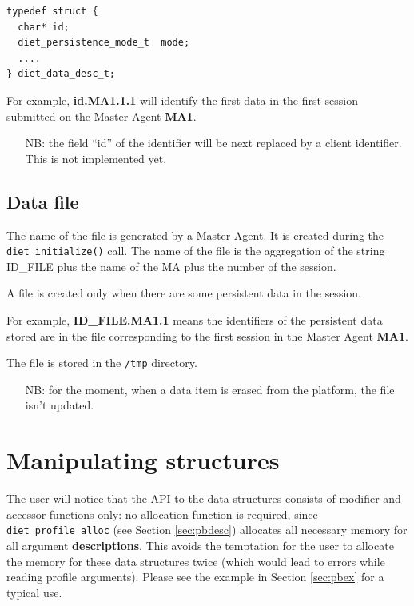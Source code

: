 {\footnotesize
\begin{verbatim}
typedef struct {
  char* id;  
  diet_persistence_mode_t  mode;
  ....
} diet_data_desc_t;
\end{verbatim}
}

For example, \textbf{id.MA1.1.1} will identify the first data
in the first session submitted on the Master Agent \textbf{MA1}.


\begin{itemize}
\item[NB:] the field ``id'' of the identifier will be next replaced by a
client identifier. This is not implemented yet.
\end{itemize}

\subsection{Data file}
\label{ssec:datafile}

The name of the file is generated by a Master Agent. It is created
during the \texttt{diet\_initialize()} call. The name of the file is
the aggregation of the string ID\_FILE plus the name of the MA plus
the number of the session.  

A file is created only when there are some persistent data in the
session.  

For example, \textbf{ID\_FILE.MA1.1} means the identifiers
of the persistent data stored are in the file corresponding to the
first session in the Master Agent \textbf{MA1}.

The file is stored in the \texttt{/tmp} directory.

\begin{itemize}
\item[NB:] for the moment, when a data item is erased from the platform, the
file isn't updated.
\end{itemize}


\section{Manipulating \diet structures}
\label{sec:manip}

The user will notice that the API to the \diet data structures consists of
modifier and accessor functions only: no allocation function is required, since
\texttt{diet\_profile\_alloc} (see Section \ref{sec:pbdesc}) allocates all
necessary memory for all argument \textbf{descriptions}. This avoids the
temptation for the user to allocate the memory for these data structures twice
(which would lead to \diet errors while reading profile arguments). Please see
the example in Section \ref{sec:pbex} for a typical use.
\\

